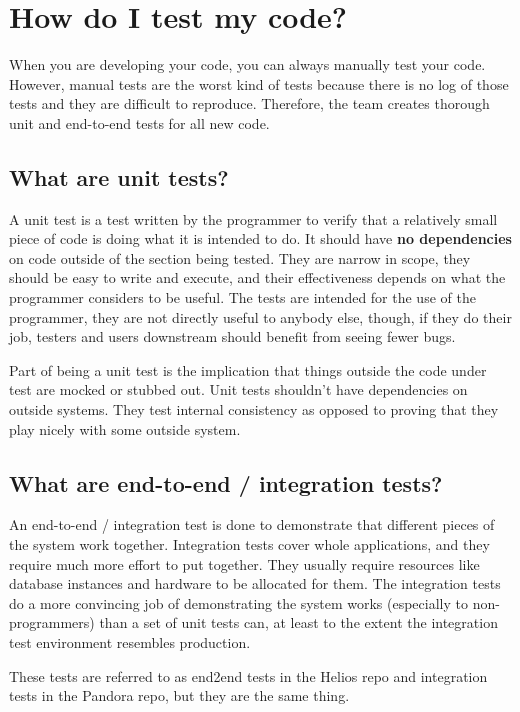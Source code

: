 \documentclass[oneside]{book}
\begin{document}
\chapter{How do I test my code?}
When you are developing your code, you can always manually test your code. However, manual tests are the worst kind of tests because there is no log of those tests and they are difficult to reproduce. Therefore, the team creates thorough unit and end-to-end tests for all new code.
\section{What are unit tests?}
A unit test is a test written by the programmer to verify that a relatively small piece of code is doing what it is intended to do. It should have \textbf{no dependencies} on code outside of the section being tested. They are narrow in scope, they should be easy to write and execute, and their effectiveness depends on what the programmer considers to be useful. The tests are intended for the use of the programmer, they are not directly useful to anybody else, though, if they do their job, testers and users downstream should benefit from seeing fewer bugs.\par
Part of being a unit test is the implication that things outside the code under test are mocked or stubbed out. Unit tests shouldn't have dependencies on outside systems. They test internal consistency as opposed to proving that they play nicely with some outside system.
\section{What are end-to-end / integration tests?}
An end-to-end / integration test is done to demonstrate that different pieces of the system work together. Integration tests cover whole applications, and they require much more effort to put together. They usually require resources like database instances and hardware to be allocated for them. The integration tests do a more convincing job of demonstrating the system works (especially to non-programmers) than a set of unit tests can, at least to the extent the integration test environment resembles production.\par
These tests are referred to as end2end tests in the Helios repo and integration tests in the Pandora repo, but they are the same thing.
\end{document}
